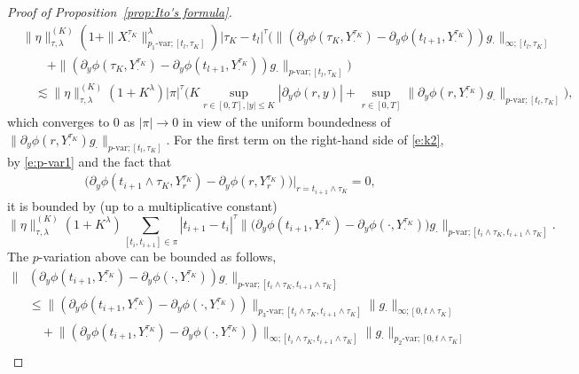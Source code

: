\documentclass[11pt,reqno]{amsart}
\numberwithin{equation}{section}
\begin{document}
\begin{proof}[Proof of Proposition~\ref{prop:Ito's formula}]
\begin{align*}						
&\|\eta\|^{(K)}_{\tau,\lambda}\left(1+\|X^{\tau_{K}}_{\cdot}\|^{\lambda}_{p_{1}\text{-var};[t_{l},\tau_K]}\right)|\tau_K-t_l|^\tau \Big(\|(\partial_{y}\phi(\tau_{K},Y^{\tau_{K}}_{\cdot}) - \partial_{y}\phi(t_{l+1},Y^{\tau_{K}}_{\cdot}))g_{\cdot}\|_{\infty;[t_{l},\tau_{K}]}\\
&\qquad  + \|(\partial_{y}\phi(\tau_{K},Y^{\tau_{K}}_{\cdot}) - \partial_{y}\phi(t_{l+1},Y^{\tau_{K}}_{\cdot}))g_{\cdot}\|_{p\text{-var};[t_{l},\tau_{K}]}\Big)\\
&\quad \lesssim  \|\eta\|^{(K)}_{\tau, \lambda} (1+K^{\lambda})|\pi|^{\tau }\Big( K\sup_{r\in[0,T], |y|\le K}|\partial_{y}\phi(r,y)| + \sup_{r\in[0,T]}\| \partial_{y}\phi(r,Y^{\tau_{K}}_{\cdot})g_{\cdot}\|_{p\text{-var};[t_{l},\tau_{K}]}\Big),
\end{align*}
which converges to 0 as $|\pi|\to0$ in view of the uniform boundedness of $\| \partial_{y}\phi(r,Y^{\tau_{K}}_{\cdot})g_{\cdot}\|_{p\text{-var};[t_{l},\tau_{K}]}$. For the first term on the right-hand side of \eqref{e:k2}, by \eqref{e:p-var1} and the fact that 
\begin{align*}		
\big(\partial_{y}\phi(t_{i+1}\land{\tau_{K}},Y^{\tau_{K}}_{r}) - \partial_{y}\phi(r,Y^{\tau_{K}}_{r})\big)\big|_{r=t_{i+1}\land\tau_{K}}=0, 
\end{align*}
it is bounded by (up to a multiplicative constant)
\begin{equation}\label{e:partial phi1}
\|\eta\|^{(K)}_{\tau, \lambda} (1+K^{\lambda}) \sum_{[t_i, t_{i+1}]\in\pi} |t_{i+1} - t_{i}|^{\tau} \big\|\big(\partial_{y}\phi(t_{i+1},Y^{\tau_{K}}_{\cdot}) - \partial_{y}\phi(\cdot,Y^{\tau_{K}}_{\cdot})\big)g_{\cdot}\big\|_{p\text{-var};[t_{i}\land \tau_{K},t_{i+1}\land \tau_{K}]}.
\end{equation}
The $p$-variation above can be bounded as follows,
\begin{align}	\nonumber
\big\|&(\partial_{y}\phi(t_{i+1},Y^{\tau_{K}}_{\cdot}) - \partial_{y}\phi(\cdot,Y^{\tau_{K}}_{\cdot}))g_{\cdot}\big\|_{p\text{-var};[t_{i}\land \tau_{K},t_{i+1}\land \tau_{K}]}\\ \nonumber
&\le 	\big\|(\partial_{y}\phi(t_{i+1},Y^{\tau_{K}}_{\cdot}) - \partial_{y}\phi(\cdot,Y^{\tau_{K}}_{\cdot}))\big\|_{p_{3}\text{-var};[t_{i}\land\tau_{K},t_{i+1}\land\tau_{K}]}\|g_{\cdot}\|_{\infty ;[0,t\land\tau_{K}]}\\ \label{e:partial phi2}
&\quad +\big\|(\partial_{y}\phi(t_{i+1},Y^{\tau_{K}}_{\cdot}) - \partial_{y}\phi(\cdot,Y^{\tau_{K}}_{\cdot}))\big\|_{\infty;[t_{i}\land\tau_{K},t_{i+1}\land\tau_{K}]}\|g_{\cdot}\|_{p_{2}\text{-var} ;[0,t\land\tau_{K}]}\\ 

\end{align}
\end{proof}
\end{document}

